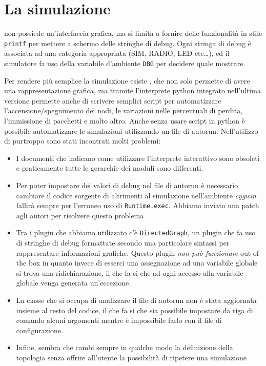 \documentclass[twoside,11pt,a4paper,italian,openany]{book}
\begin{document}
\section{La simulazione}

\tos non possiede un'interfaccia grafica, ma si limita a fornire delle funzionalità in stile 
\texttt{printf} per mettere a schermo delle stringhe di debug. 
Ogni stringa di debug è associata ad una categoria appropriata (SIM, RADIO, LED etc\ldots), 
ed il simulatore fa uso della variabile d'ambiente \texttt{DBG} per decidere quale mostrare. 

Per rendere più semplice la simulazione esiste \tv, che non solo permette di avere una 
rappresentazione grafica, ma tramite l'interprete python integrato nell'ultima versione 
permette anche di scrivere semplici script per automatizzare l'accensione/spegnimento dei nodi,
le variazioni nelle percentuali di perdita, l'immissione di pacchetti e molto altro. 
Anche senza usare script in python è possibile automatizzare le simulazioni utilizzando un file 
di autorun.
Nell'utilizzo di \tv purtroppo sono stati incontrati molti problemi:
\begin{itemize}
\item{I documenti che indicano come utilizzare l'interprete interattivo sono obsoleti e 
praticamente tutte le gerarchie dei moduli sono differenti.}
\item{Per poter impostare dei valori di debug nel file di autorun è necessario  
cambiare il codice sorgente di \tv altrimenti al simulazione nell'ambiente \emph{cygwin} 
fallirà sempre per l'erroneo uso di \texttt{Runtime.exec}. Abbiamo inviato una patch 
agli autori per risolvere questo problema}
\item{Tra i plugin  che abbiamo utilizzato c'è \texttt{DirectedGraph}, un plugin che fa uso 
di stringhe di debug formattate secondo una particolare sintassi per rappresentare informazioni 
grafiche. Questo plugin \emph{non può funzionare} out of the box in quanto invece di esserci 
una assegnazione ad una variabile globale si trova una ridichiarazione, il che fa si che 
ad ogni accesso alla variabile globale venga generata un'eccezione.}
\item{La classe che si occupa di analizzare il file di autorun non è stata aggiornata insieme 
al resto del codice, il che fa si che sia possibile impostare da riga di comando alcuni 
argomenti mentre è impossibile farlo con il file di configurazione.}
\item{Infine, sembra che \tv cambi sempre in qualche modo la definizione della topologia senza 
offrire all'utente la possibilità di ripetere una simulazione}
\end{itemize}
\end{document}
